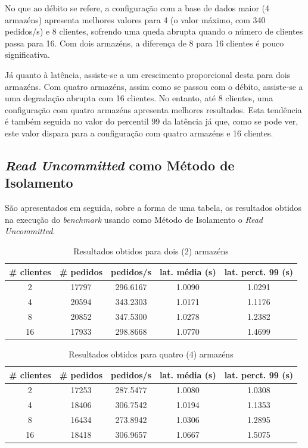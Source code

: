 No que ao débito se refere, a configuração com a base de dados maior (4 armazéns) apresenta melhores valores para 4 (o valor máximo, com 340 pedidos/s) e 8 clientes, sofrendo uma queda abrupta quando o número de clientes passa para 16.
Com dois armazéns, a diferença de 8 para 16 clientes é pouco significativa.

Já quanto à latência, assiste-se a um crescimento proporcional desta para dois armazéns.
Com quatro armazéns, assim como se passou com o débito, assiste-se a uma degradação abrupta com 16 clientes.
No entanto, até 8 clientes, uma configuração com quatro armazéns apresenta melhores resultados.
Esta tendência é também seguida no valor do percentil 99 da latência já que, como se pode ver, este valor dispara para a configuração com quatro armazéns e 16 clientes.

\newpage

\subsection{\textit{Read Uncommitted} como Método de Isolamento}

São apresentados em seguida, sobre a forma de uma tabela, os resultados obtidos na execução do \textit{benchmark} usando como Método de Isolamento o \textit{Read Uncommitted}.

\begin{table}[!h]
\center
\small
\begin{tabular}{|c|c|c|c|c|}
\hline
\textbf{\# clientes} & \textbf{\# pedidos} & \textbf{pedidos/s} & \textbf{lat. média (s)} & \textbf{lat. perct. 99 (s)}  \\ \hline
2 & 17797 & 296.6167 & 1.0090 & 1.0291  \\ \hline
4 & 20594 & 343.2303 & 1.0171 & 1.1176  \\ \hline
8 & 20852 & 347.5300 & 1.0278 & 1.2382  \\ \hline
16 & 17933 & 298.8668 & 1.0770 & 1.4699  \\ \hline
\end{tabular}
\caption{Resultados obtidos para dois (2) armazéns}
\end{table}

\begin{table}[!h]
\center
\small
\begin{tabular}{|c|c|c|c|c|}
\hline
\textbf{\# clientes} & \textbf{\# pedidos} & \textbf{pedidos/s} & \textbf{lat. média (s)} & \textbf{lat. perct. 99 (s)}  \\ \hline
2 & 17253 & 287.5477 & 1.0080 & 1.0308  \\ \hline
4 & 18406 & 306.7542 & 1.0194 & 1.1353  \\ \hline
8 & 16434 & 273.8942 & 1.0306 & 1.2895  \\ \hline
16 & 18418 & 306.9657 & 1.0667 & 1.5075  \\ \hline
\end{tabular}
\caption{Resultados obtidos para quatro (4) armazéns}
\end{table}

